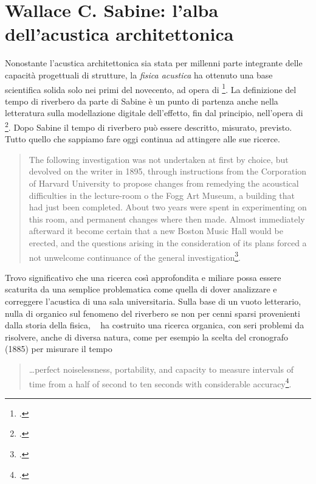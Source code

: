 \section{Wallace C. Sabine: l'alba dell'acustica architettonica}


\bigskip

Nonostante l'acustica architettonica sia stata per millenni parte integrante
delle capacità progettuali di strutture, la \emph{fisica acustica} ha ottenuto
una base scientifica solida solo nei primi del novecento, ad opera di
\ws\footcite{ws:rev}. La definizione del tempo di riverbero da parte di Sabine è un
punto di partenza anche nella letteratura sulla modellazione digitale
dell'effetto, fin dal principio, nell'opera di \ms\footcite{ms:rev62, ms:rev64}.
Dopo Sabine il tempo di riverbero può essere descritto, misurato, previsto.
Tutto quello che sappiamo fare oggi continua ad attingere alle sue ricerce.

\begin{quote}
  The following investigation was not undertaken at first by choice, but devolved
  on the writer in 1895, through instructions from the Corporation of Harvard
  University to propose changes from remedying the acoustical difficulties in
  the lecture-room o the Fogg Art Museum, a building that had just been completed.
  About two years were spent in experimenting on this room, and permanent changes
  where then made. Almost immediately afterward it become certain that a new
  Boston Music Hall would be erected, and the questions arising in the
  consideration of its plans forced a not unwelcome continuance of the general
  investigation\footcite{ws:rev}.
\end{quote}

Trovo significativo che una ricerca così approfondita e miliare possa essere
scaturita da una semplice problematica come quella di dover analizzare e
correggere l'acustica di una sala universitaria. Sulla base di un vuoto letterario,
nulla di organico sul fenomeno del riverbero se non per cenni sparsi provenienti
dalla storia della fisica, \ms~ ha costruito una ricerca organica, con seri
problemi da risolvere, anche di diversa natura, come per esempio la scelta del
cronografo (1885) per misurare il tempo

\begin{quote}
  \ldots perfect noiselessness, portability, and capacity to measure intervals
  of time from a half of second to ten seconds with considerable accuracy\footcite{ws:rev}.
\end{quote}

